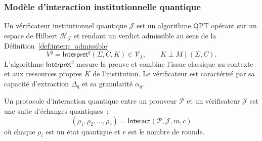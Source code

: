 \begin{sloppypar}
\subsubsection{Mod\`ele d'interaction institutionnelle quantique}
\label{subsubsec:interaction_institutionnelle}

\begin{definition}\label{def:verificateur_institutionnel_quantique}
Un v\'erificateur institutionnel quantique $\mathcal{J}$ est un algorithme
QPT op\'erant sur un espace de Hilbert $\mathcal{H}_\mathcal{J}$ et
rendant un verdict admissible au sens de la D\'efinition~\ref{def:interp_admissible}
\begin{equation}
V^q = \mathsf{Interpret}^q(\Sigma, C, K) \in \mathcal{V}_\lambda,
\qquad K \perp M \mid (\Sigma, C).
\end{equation}
L'algorithme $\mathsf{Interpret}^q$ mesure la preuve et combine l'issue classique au
contexte et aux ressources propres $K$ de l'institution.
Le v\'erificateur est caract\'eris\'e par sa capacit\'e d'extraction
$\Delta_q$ et sa granularit\'e $\alpha_q$.
\end{definition}

\begin{definition}\label{def:protocole_interaction_quantique}
Un protocole d'interaction quantique entre un prouveur $\mathcal{P}$ et
un v\'erificateur $\mathcal{J}$ est une suite d'\'echanges quantiques~:
\begin{equation}
(\rho_1, \rho_2, \ldots, \rho_r) = \mathsf{Interact}(\mathcal{P}, \mathcal{J}, m, c)
\end{equation}
o\`u chaque $\rho_i$ est un \'etat quantique et $r$ est le nombre de rounds.
\end{definition}


\end{sloppypar}
